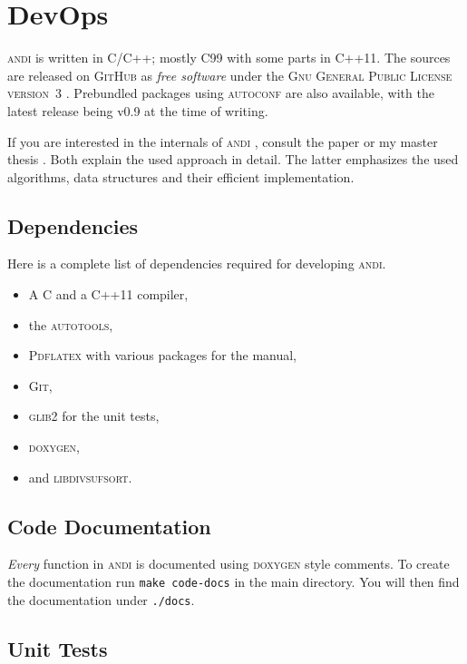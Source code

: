 \documentclass[a4paper,
  10pt,
  english,
  DIV=12,
  BCOR=8mm]{scrbook}
\newcommand{\algo}[1]{\textsc{{#1}}}
\newcommand{\andi}{\algo{andi} }
\begin{document}
\chapter{DevOps} %

\andi is written in C/C++; mostly C99 with some parts in C++11. The sources are released on \algo{GitHub} as \emph{free software} under the \textsc{Gnu General Public License version~3} \cite{GPL}. Prebundled packages using \algo{autoconf} are also available, with the latest release being {v0.9} at the time of writing.

If you are interested in the internals of \andi, consult the paper \cite{andi} or my master thesis \cite{kloetzl}. Both explain the used approach in detail. The latter emphasizes the used algorithms, data structures and their efficient implementation.

\section{Dependencies}

Here is a complete list of dependencies required for developing \algo{andi}.

\begin{itemize}
  \item A C and a C++11 compiler,
  \item the \algo{autotools},
  \item \algo{Pdflatex} with various packages for the manual,
  \item \algo{Git},
  \item \algo{glib2} for the unit tests,
  \item \algo{doxygen},
  \item and \algo{libdivsufsort}.
\end{itemize}


\section{Code Documentation}

\emph{Every} function in \andi is documented using \algo{doxygen} style comments. To create the documentation run \lstinline$make code-docs$ in the main directory. You will then find the documentation under \lstinline$./docs$.


\section{Unit Tests}
\end{document}
